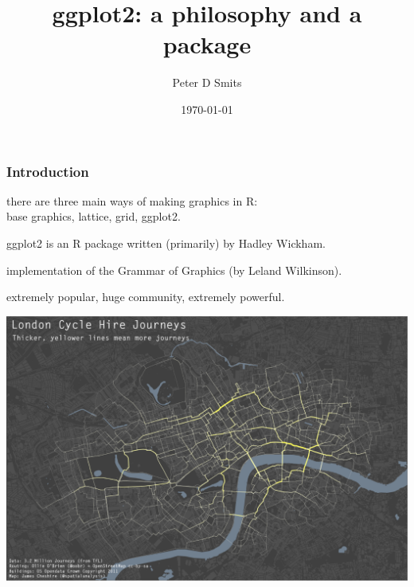 \documentclass{beamer}\usepackage{graphicx, color}
\title{ggplot2: a philosophy and a package}
\author{Peter D Smits}
\institute{Committee on Evolutionary Biology \\
University of Chicago}
\date{\today}
\begin{document}
\begin{frame}
  \maketitle
\end{frame}

\begin{frame}
  \frametitle{Introduction}

  there are three main ways of making graphics in R:\\
  base graphics, lattice, grid, ggplot2.

  ggplot2 is an R package written (primarily) by Hadley Wickham.

  implementation of the Grammar of Graphics (by Leland Wilkinson).

  extremely popular, huge community, extremely powerful.

\end{frame}

\begin{frame}
  \includegraphics[width = \textwidth, keepaspectratio = true]{figure/bike_ggplot}

\end{frame}
\end{document}
